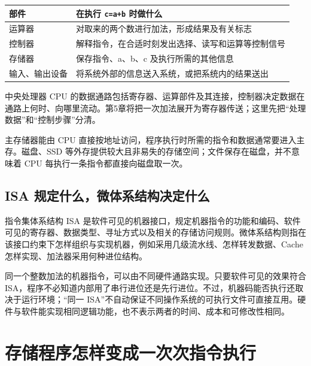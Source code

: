 \par\medskip\noindent\begin{minipage}{\linewidth}\fontsize{9.3}{12}\selectfont\begin{tabularx}{\linewidth}{@{}YY@{}}
\toprule\noalign{}
部件 & 在执行 \texttt{c=\allowbreak{}a+\allowbreak{}b} 时做什么 \\
\midrule\noalign{}


运算器 & 对取来的两个数进行加法，形成结果及有关标志 \\
控制器 & 解释指令，在合适时刻发出选择、读写和运算等控制信号 \\
存储器 & 保存指令、a、b、c 及执行所需的其他信息 \\
输入、输出设备 & 将系统外部的信息送入系统，或把系统内的结果送出 \\
\bottomrule\end{tabularx}
\end{minipage}\par\medskip

中央处理器 CPU 的数据通路包括寄存器、运算部件及其连接，控制器决定数据在通路上何时、向哪里流动。第5章将把一次加法展开为寄存器传送；这里先把``处理数据''和``控制步骤''分清。

主存储器能由 CPU 直接按地址访问，程序执行时所需的指令和数据通常要进入主存。磁盘、SSD 等外存提供较大且非易失的存储空间；文件保存在磁盘，并不意味着 CPU 每执行一条指令都直接向磁盘取一次。

\subsection{ISA 规定什么，微体系结构决定什么}\label{CO01-03}

指令集体系结构 ISA 是软件可见的机器接口，规定机器指令的功能和编码、软件可见的寄存器、数据类型、寻址方式以及相关的存储访问规则。微体系结构则指在该接口约束下怎样组织与实现机器，例如采用几级流水线、怎样转发数据、Cache 怎样实现、加法器采用何种进位结构。

同一个整数加法的机器指令，可以由不同硬件通路实现。只要软件可见的效果符合 ISA，程序不必知道内部用了串行进位还是先行进位。不过，机器码能否执行还取决于运行环境；``同一 ISA''不自动保证不同操作系统的可执行文件可直接互用。硬件与软件能实现相同逻辑功能，也不表示两者的时间、成本和可修改性相同。

\section{存储程序怎样变成一次次指令执行}\label{CO01-04}

